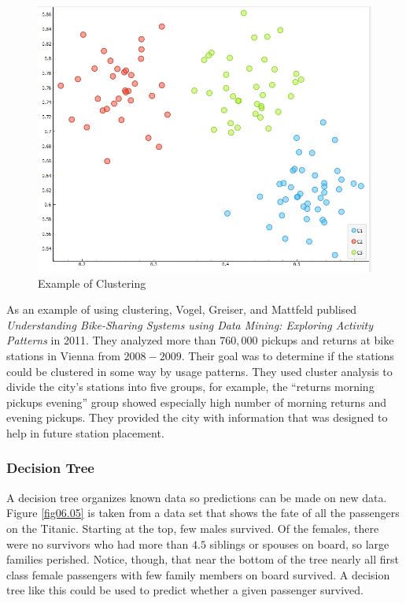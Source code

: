 \begin{figure}[H]
	\centering
	\includegraphics[width=\maxwidth{.95\linewidth}]{gfx/06-Cluster}
	\caption{Example of Clustering}
	\label{fig06.11}
\end{figure}

As an example of using clustering, Vogel, Greiser, and Mattfeld publised \textit{Understanding Bike-Sharing Systems using Data Mining: Exploring Activity Patterns}\cite{vogel2011understanding} in 2011. They analyzed more than $ 760,000 $ pickups and returns at bike stations in Vienna from $ 2008-2009 $. Their goal was to determine if the stations could be clustered in some way by usage patterns. They used cluster analysis to divide the city's stations into five groups, for example, the ``returns morning pickups evening'' group showed especially high number of morning returns and evening pickups. They provided the city with information that was designed to help in future station placement.

\subsubsection{Decision Tree}

A decision tree organizes known data so predictions can be made on new data. Figure \ref{fig06.05} is taken from a data set that shows the fate of all the passengers on the Titanic. Starting at the top, few males survived. Of the females, there were no survivors who had more than $ 4.5 $ siblings or spouses on board, so large families perished. Notice, though, that near the bottom of the tree nearly all first class female passengers with few family members on board survived. A decision tree like this could be used to predict whether a given passenger survived. 

